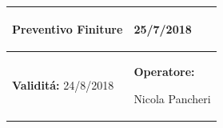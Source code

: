 \documentclass[a4paper]{article}
\begin{document}
                          \begin{center}
                          \begin{tabular}{|L{89mm} R{60mm}| }
                          \hline
                          \vspace{2.5mm}
                          \begin{spacing}{0}
                            \textbf{Preventivo Finiture}
                          \end{spacing}&
                          \vspace{2.5mm}
                          \begin{spacing}{0}

                     25/7/2018

                          \end{spacing}\\
                          \hline
                          \vspace{2.5mm}
                          \begin{spacing}{0}
                            \textbf{Validit\'a:}
                       24/8/2018
                          \end{spacing} &
                          \vspace{2.5mm}
                          \begin{spacing}{0}
                            \textbf{Operatore:}

                       Nicola Pancheri
                          \end{spacing} \\
                          \hline
                          \end{tabular}
                          \end{center}
\end{document}
